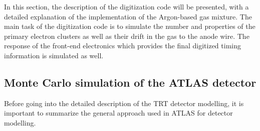 In this section, the description of the digitization code will be presented, with a detailed explanation of the implementation of the Argon-based gas mixture.
The main task of the digitization code is to simulate the number and properties of the primary electron clusters as well as their drift in the gas to the anode wire. 
The response of the front-end electronics which provides the final digitized timing information is simulated as well. 

\subsection{Monte Carlo simulation of the ATLAS detector}

Before going into the detailed description of the TRT detector modelling, it is important to summarize the
general approach used in ATLAS for detector modelling.

